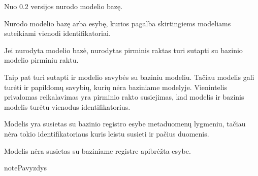 \documentclass[letterpaper,10pt,lithuanian]{sphinxmanual}
\begin{document}
\begin{fulllineitems}
\label{\detokenize{dimensijos:model.type}}
\pysigstartsignatures
{}
\pysigstopsignatures
\sphinxAtStartPar
{}Nuo 0.2 versijos nurodo modelio bazę.

\sphinxAtStartPar
Nurodo modelio bazę arba esybę, kurios pagalba skirtingiems modeliams
suteikiami vienodi identifikatoriai.

\sphinxAtStartPar
Jei nurodyta modelio bazė, {\hyperref[\detokenize{dimensijos:model.ref}]{}} nurodytas pirminis raktas turi
sutapti su bazinio modelio pirminiu raktu.

\sphinxAtStartPar
Taip pat turi sutapti ir modelio savybės su baziniu modeliu. Tačiau modelis
gali turėti ir papildomų savybių, kurių nėra baziniame modelyje.
Vienintelis privalomas reikalavimas yra pirminio rakto susiejimas, kad
modelis ir bazinis modelis turėtu vienodus identifikatorius.

\begin{sphinxShadowBox}
\begin{description}
\sphinxAtStartPar
Modelis yra susietas su bazinio registro esybe metaduomenų
lygmeniu, tačiau nėra tokio identifikatoriaus kuris leistu susieti
ir pačius duomenis.

\sphinxAtStartPar
Modelis nėra susietas su baziniame registre apibrėžta esybe.

\end{description}
\end{sphinxShadowBox}

\begin{sphinxadmonition}{note}{Pavyzdys}

\sphinxAtStartPar
{}

\begin{DUlineblock}{0em}
\item[] 
\end{DUlineblock}

\sphinxAtStartPar
{}



\end{sphinxadmonition}
\end{fulllineitems}
\end{document}
